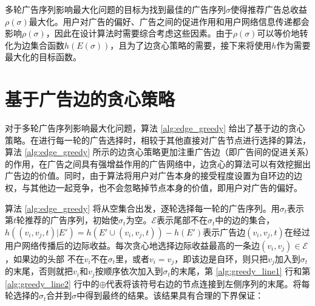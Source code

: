 多轮广告序列影响最大化问题的目标为找到最佳的广告序列$\sigma$使得推荐广告总收益$\rho(\sigma)$最大化。用户对广告的偏好、广告之间的促进作用和用户网络信息传递都会影响$\rho(\sigma)$，因此在设计算法时需要综合考虑这些因素。由于$\rho(\sigma)$可以等价地转化为边集合函数$h(E(\sigma))$，且为了边贪心策略的需要，接下来将使用$h$作为需要最大化的目标函数。

\section{基于广告边的贪心策略}
\label{sec:greedy}
对于多轮广告序列影响最大化问题，算法 \ref{alg:edge_greedy} 给出了基于边的贪心策略。在进行每一轮的广告选择时，相较于其他直接对广告节点进行选择的算法\cite{kempe2008ad1,tang2017robust,tang2018social}，算法 \ref{alg:edge_greedy} 所示的边贪心策略更加注重广告边（即广告间的促进关系）的作用，在广告之间具有强增益作用的广告网络中，边贪心的算法可以有效挖掘出广告边的价值。同时，由于算法将用户对广告本身的接受程度设置为自环边的边权，与其他边一起竞争，也不会忽略掉节点本身的价值，即用户对广告的偏好。

算法 \ref{alg:edge_greedy} 将从空集合出发，逐轮选择每一轮的广告序列。用$\sigma_t$表示第$t$轮推荐的广告序列，初始使$\sigma_t$为空。$\mathcal{E}$表示尾部不在$\sigma_t$中的边的集合，$h((v_i,v_j,t)|E')=h(E'\cup{(v_i,v_j,t)})-h(E')$表示广告边$(v_i,v_j,t)$在经过用户网络传播后的边际收益。每次贪心地选择边际收益最高的一条边$(v_i,v_j)\in \mathcal{E}$，如果边的头部 不在$v_i$不在$\sigma_t$里，或者$v_i=v_j$，即该边是自环，则只把$v_j$加入到$\sigma_t$的末尾，否则就把$v_i$和$v_j$按顺序依次加入到$\sigma_t$的末尾，第 \ref{alg:greedy_line1} 行和第 \ref{alg:greedy_line2} 行中的$\oplus$代表将该符号右边的节点连接到左侧序列的末尾。将每轮选择的$\sigma_t$合并到$\sigma$中得到最终的结果。该结果具有合理的下界保证：

